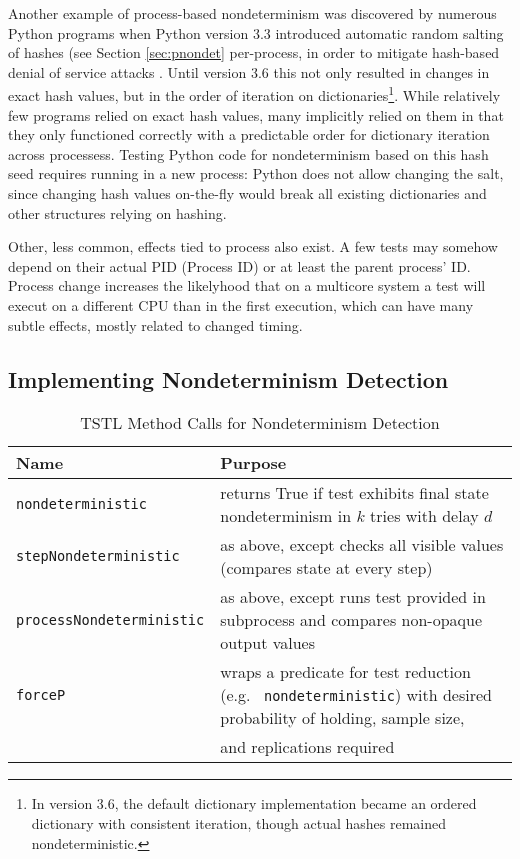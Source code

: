 Another example of process-based nondeterminism was discovered by numerous Python programs when Python
version 3.3 introduced automatic random salting of hashes (see Section
\ref{sec:pnondet} per-process,
in order to mitigate hash-based denial of service attacks
\cite{denial}.  Until version 3.6 this not only resulted in changes in
exact hash values, but in the order of iteration on
dictionaries\footnote{In version 3.6, the default dictionary
  implementation became an ordered dictionary with consistent
  iteration, though actual hashes remained nondeterministic.}.  While
relatively few programs relied on exact hash values, many implicitly
relied on them in that they only functioned correctly with a
predictable order for dictionary iteration across processess.  Testing
Python code for nondeterminism based on this hash seed requires
running in a new process:  Python does not allow changing the salt, since changing hash values on-the-fly would
break all existing dictionaries and other structures relying on
hashing.

Other, less common, effects tied to process also exist.  A few tests
may somehow depend on their actual PID (Process ID) or at least the
parent process' ID.  Process change increases the likelyhood that on a multicore
system a test will execut on a different CPU than in the first
execution, which can have many subtle effects, mostly related to
changed timing.

\subsection{Implementing Nondeterminism Detection}


\begin{table*}
\centering
{%

\caption{TSTL Method Calls for Nondeterminism Detection}
\label{tab:methods}
\begin{tabular}{l|l}
Name & Purpose \\
\hline
\hline
{\tt nondeterministic} & returns True if test exhibits final state nondeterminism in $k$
  tries with delay $d$\\
\hline
{\tt stepNondeterministic} & as above, except checks all visible values
                       (compares state at every step)\\
\hline
{\tt processNondeterministic} & as above, except runs test provided in
                          subprocess and compares non-opaque output
                          values \\
\hline
{\tt forceP} & wraps a predicate for test reduction (e.g. {\tt
         nondeterministic}) with desired probability of holding,
         sample size,\\
&  and replications required \\
\hline
\hline

\end{tabular}
}
\end{table*}

